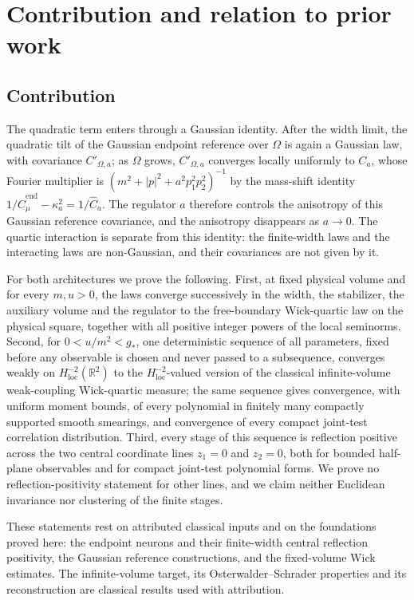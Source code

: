 \documentclass[11pt]{article}
\theoremstyle{plain}
\theoremstyle{definition}
\theoremstyle{remark}
\newcommand{\R}{\mathbb{R}}
\newcommand{\hCend}{\hat C^{\mathrm{end}}_{\mu}}
\begin{document}
\section{Contribution and relation to prior work}\label{sec:prior}

\subsection{Contribution}\label{sec:prior-contrib}

The quadratic term enters through a Gaussian identity. After the width limit,
the quadratic tilt of the Gaussian endpoint reference over $\Omega$ is again a
Gaussian law, with covariance $C'_{\Omega,a}$; as $\Omega$ grows, $C'_{\Omega,a}$ converges
locally uniformly to $C_a$, whose Fourier multiplier is
$(m^{2}+|p|^{2}+a^{2}p_1^{2}p_2^{2})^{-1}$ by the mass-shift identity
$1/\hCend-\kappa_a^{2}=1/\hat C_a$. The regulator $a$ therefore controls the anisotropy of
this Gaussian reference covariance, and the anisotropy disappears as $a\to0$. The
quartic interaction is separate from this identity: the finite-width laws and
the interacting laws are non-Gaussian, and their covariances are not given by it.

For both architectures we prove the following. First, at fixed physical volume
and for every $m,u>0$, the laws converge successively in the width, the
stabilizer, the auxiliary volume and the regulator to the free-boundary
Wick-quartic law on the physical square, together with all positive integer
powers of the local seminorms. Second, for $0<u/m^{2}<g_{*}$, one deterministic
sequence of all parameters, fixed before any observable is chosen and never
passed to a subsequence, converges weakly on $H^{-2}_{\mathrm{loc}}(\R^{2})$ to the
$H^{-2}_{\mathrm{loc}}$-valued version of the classical infinite-volume
weak-coupling Wick-quartic measure; the same sequence gives convergence, with
uniform moment bounds, of every polynomial in finitely many compactly supported
smooth smearings, and convergence of every compact joint-test correlation
distribution. Third, every stage of this sequence is reflection positive across
the two central coordinate lines $z_1=0$ and $z_2=0$, both for bounded
half-plane observables and for compact joint-test polynomial forms. We prove no
reflection-positivity statement for other lines, and we claim neither Euclidean
invariance nor clustering of the finite stages.

These statements rest on attributed classical inputs and on the foundations
proved here: the endpoint neurons and their finite-width central reflection
positivity, the Gaussian reference constructions, and the fixed-volume Wick
estimates. The infinite-volume target, its Osterwalder--Schrader properties and
its reconstruction are classical results used with attribution.
\end{document}
